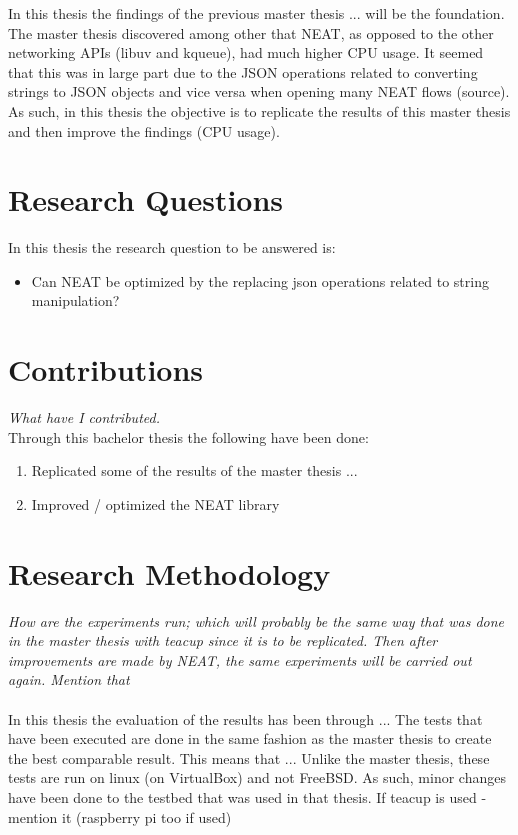 \documentclass[12pt]{report}
\begin{document}
In this thesis the findings of the previous master thesis ... will be the foundation. The master thesis discovered among other that NEAT, as opposed to the other networking APIs (libuv and kqueue), had much higher CPU usage. It seemed that this was in large part due to the JSON operations related to converting strings to JSON objects and vice versa when opening many NEAT flows (source). As such, in this thesis the objective is to replicate the results of this master thesis and then improve the findings (CPU usage).

\section{Research Questions}
In this thesis the research question to be answered is: 
\begin{itemize}
\item Can NEAT be optimized by the replacing json operations related to string manipulation?
\end{itemize}

\section{Contributions}
\textit{What have I contributed.} \\
Through this bachelor thesis the following have been done:
\begin{enumerate}
\item Replicated some of the results of the master thesis ...
\item Improved / optimized the NEAT library 
\end{enumerate}


\section{Research Methodology}
\textit{How are the experiments run; which will probably be the same way that was done in the master thesis with teacup since it is to be replicated. Then after improvements are made by NEAT, the same experiments will be carried out again. Mention that}  \\ \\
In this thesis the evaluation of the results has been through ...
The tests that have been executed are done in the same fashion as the master thesis to create the best comparable result. This means that ...
Unlike the master thesis, these tests are run on linux (on VirtualBox) and not FreeBSD. As such, minor changes have been done to the testbed that was used in that thesis.
If teacup is used - mention it (raspberry pi too if used)
\end{document}
